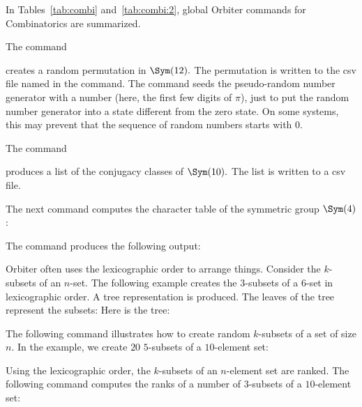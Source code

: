 In Tables~\ref{tab:combi} and~\ref{tab:combi:2},  
global Orbiter commands for Combinatorics are summarized.

\bigskip



The command 


creates a random permutation in $\Sym(12).$ 
The permutation is written to the csv file named in the command. 
The command seeds the pseudo-random number generator with a number (here, the first few digits of $\pi$), 
just to put the random number generator into a state different from the zero state. 
On some systems, this may prevent that the sequence of random numbers starts with 0. 


\bigskip





The command 


produces a list of the conjugacy classes of $\Sym(10).$ 
The list is written to a csv file. 


\bigskip


The next command computes the character table of the symmetric group $\Sym(4)$:


The command produces the following output:

\bigskip


Orbiter often uses the lexicographic order to arrange things. 
Consider the $k$-subsets of an $n$-set. 
The following example creates the $3$-subsets of a $6$-set 
in lexicographic order. 
A tree representation is produced. 
The leaves of the tree represent the subsets:
Here is the tree:


\bigskip


The following command illustrates how to create random $k$-subsets of a set of size $n$.
In the example, we create $20$ $5$-subsets of a $10$-element set:




\bigskip

Using the lexicographic order, 
the $k$-subsets of an $n$-element set are ranked.
The following command computes the ranks 
of a number of $3$-subsets of a $10$-element set:

